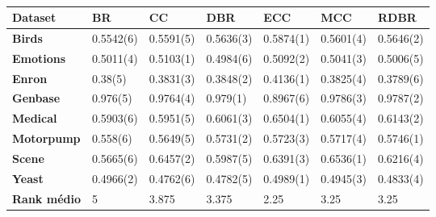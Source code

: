 \begin{table}[\tabmode]
\begin{tabular}{lllllll}
\hline
\textbf{Dataset} & \textbf{BR} & \textbf{CC} & \textbf{DBR} & \textbf{ECC} & \textbf{MCC} & \textbf{RDBR} \\ \hline
\textbf{Birds}                  & 0.5542(6)   & 0.5591(5)   & 0.5636(3)    & 0.5874(1)    & 0.5601(4)    & 0.5646(2)     \\
\textbf{Emotions}               & 0.5011(4)   & 0.5103(1)   & 0.4984(6)    & 0.5092(2)    & 0.5041(3)    & 0.5006(5)     \\
\textbf{Enron}                  & 0.38(5)     & 0.3831(3)   & 0.3848(2)    & 0.4136(1)    & 0.3825(4)    & 0.3789(6)     \\
\textbf{Genbase}                & 0.976(5)    & 0.9764(4)   & 0.979(1)     & 0.8967(6)    & 0.9786(3)    & 0.9787(2)     \\
\textbf{Medical}                & 0.5903(6)   & 0.5951(5)   & 0.6061(3)    & 0.6504(1)    & 0.6055(4)    & 0.6143(2)     \\
\textbf{Motorpump}              & 0.558(6)    & 0.5649(5)   & 0.5731(2)    & 0.5723(3)    & 0.5717(4)    & 0.5746(1)     \\
\textbf{Scene}                  & 0.5665(6)   & 0.6457(2)   & 0.5987(5)    & 0.6391(3)    & 0.6536(1)    & 0.6216(4)     \\
\textbf{Yeast}                  & 0.4966(2)   & 0.4762(6)   & 0.4782(5)    & 0.4989(1)    & 0.4945(3)    & 0.4833(4)     \\ \hline
\textbf{Rank médio}             & 5           & 3.875       & 3.375        & 2.25         & 3.25         & 3.25          \\ \hline
\end{tabular}
\caption{}
\label{tab:EBAlogi}
\end{table}